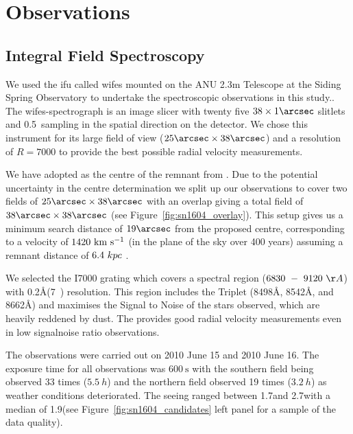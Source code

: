 \documentclass[preprint2]{aastex}
\begin{document}
\section{Observations}
\label{sec:observations}
\subsection{Integral Field Spectroscopy}
We used the \gls{ifu} called \gls{wifes} mounted on the ANU 2.3m Telescope at the Siding Spring Observatory  to undertake the spectroscopic observations in this study.. The \gls{wifes}-spectrograph is an image slicer with twenty five $38\times 1\arcsec$ slitlets and 0.5\arcsec\ sampling in the spatial direction on the detector. We chose this instrument for its large field of view ($25\arcsec\times38\arcsec$) and a resolution of $R=7000$ to provide the best possible radial velocity measurements. 

We have adopted   as the centre of the remnant from \citet{2008ApJ...689..225K}. Due to the potential uncertainty in the centre determination \citep[for a more detailed discussion about the difficulty of centre determination see Section~2.2 in][]{2012ApJ...759....7K} we split up our observations to cover two fields of $25\arcsec\times38\arcsec$ with an overlap giving a total field of $38\arcsec\times38\arcsec$ (see Figure~\ref{fig:sn1604_overlay}). This setup gives us a minimum search distance of $19\arcsec$ from the proposed centre, corresponding to a velocity of $1420~\textrm{km}~\textrm{s}^{-1}$ (in the plane of the sky over 400 years) assuming a remnant distance of $6.4~kpc$ \citep{2012A&A...537A.139C}. 



We selected the I7000 grating which covers a spectral region  ($6830~-~9120~\AA$) with 0.2\AA (7~\kms) resolution. This region includes the  Triplet (8498\AA, 8542\AA, and 8662\AA) and maximises the Signal to Noise of the stars observed, which are heavily reddened by dust. The  provides good radial velocity measurements even in low \gls{signalnoise} ratio observations.

The observations were carried out  on 2010 June 15 and 2010 June 16. The exposure time for all observations was $600~\textrm{s}$ with the southern field being observed 33 times ($5.5~h$) and the northern field observed 19 times ($3.2~h$) as weather conditions deteriorated. 
The seeing ranged between 1.7\arcsec and 2.7\arcsec with a median of 1.9\arcsec (see Figure~\ref{fig:sn1604_candidates} left panel for a sample of the data quality). 
\end{document}
